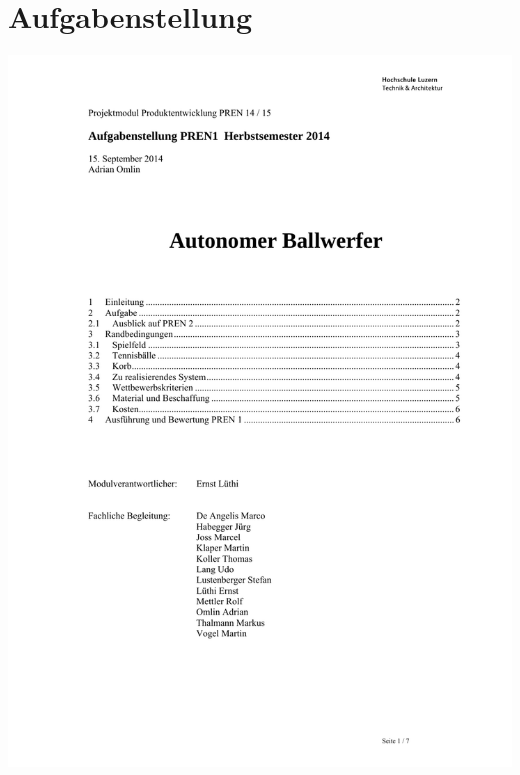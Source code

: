 

\newcommand{\myTitel}{Anhang zur Dokumentation}

    
    
    \renewcommand{\contentsname}{Inhalt}
    \tableofcontents
    \newpage
    


     \section{Aufgabenstellung}
	     \includegraphics[page=1,scale=0.86,clip,trim=33mm 40mm 20mm 30mm] {Anhangsdokument/Aufgabenstellung_PREN1_H14.pdf}
